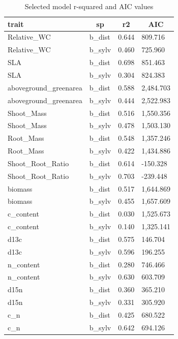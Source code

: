 \documentclass[jou,floatsintext]{apa6}
\begin{document}
\begin{table}[tbp]
\begin{center}
\begin{threeparttable}
\caption{\label{tab:modelsr2}Selected model r-squared and AIC values}
\tiny{
\begin{tabular}{llll}
\toprule
trait & \multicolumn{1}{c}{sp} & \multicolumn{1}{c}{r2} & \multicolumn{1}{c}{AIC}\\
\midrule
Relative\_WC & b\_dist & 0.644 & 809.716\\
Relative\_WC & b\_sylv & 0.460 & 725.960\\
SLA & b\_dist & 0.698 & 851.463\\
SLA & b\_sylv & 0.304 & 824.383\\
aboveground\_greenarea & b\_dist & 0.588 & 2,484.703\\
aboveground\_greenarea & b\_sylv & 0.444 & 2,522.983\\
Shoot\_Mass & b\_dist & 0.516 & 1,550.356\\
Shoot\_Mass & b\_sylv & 0.478 & 1,503.130\\
Root\_Mass & b\_dist & 0.548 & 1,357.246\\
Root\_Mass & b\_sylv & 0.422 & 1,434.886\\
Shoot\_Root\_Ratio & b\_dist & 0.614 & -150.328\\
Shoot\_Root\_Ratio & b\_sylv & 0.703 & -239.448\\
biomass & b\_dist & 0.517 & 1,644.869\\
biomass & b\_sylv & 0.455 & 1,657.609\\
c\_content & b\_dist & 0.030 & 1,525.673\\
c\_content & b\_sylv & 0.140 & 1,325.141\\
d13c & b\_dist & 0.575 & 146.704\\
d13c & b\_sylv & 0.596 & 196.255\\
n\_content & b\_dist & 0.280 & 746.466\\
n\_content & b\_sylv & 0.630 & 603.709\\
d15n & b\_dist & 0.360 & 365.210\\
d15n & b\_sylv & 0.331 & 305.920\\
c\_n & b\_dist & 0.425 & 680.522\\
c\_n & b\_sylv & 0.642 & 694.126\\
\bottomrule
\end{tabular}
}
\end{threeparttable}
\end{center}
\end{table}
\end{document}
